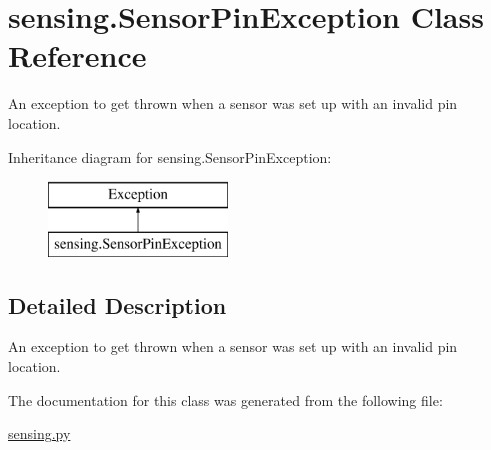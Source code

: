 \hypertarget{classsensing_1_1_sensor_pin_exception}{\section{sensing.\-Sensor\-Pin\-Exception Class Reference}
\label{classsensing_1_1_sensor_pin_exception}
}


An exception to get thrown when a sensor was set up with an invalid pin location.  


Inheritance diagram for sensing.\-Sensor\-Pin\-Exception\-:\begin{figure}[H]
\begin{center}
\leavevmode
\includegraphics[height=2.000000cm]{classsensing_1_1_sensor_pin_exception}
\end{center}
\end{figure}


\subsection{Detailed Description}
An exception to get thrown when a sensor was set up with an invalid pin location. 

The documentation for this class was generated from the following file\-:\begin{DoxyCompactItemize}
\item 
\hyperlink{sensing_8py}{sensing.\-py}\end{DoxyCompactItemize}
